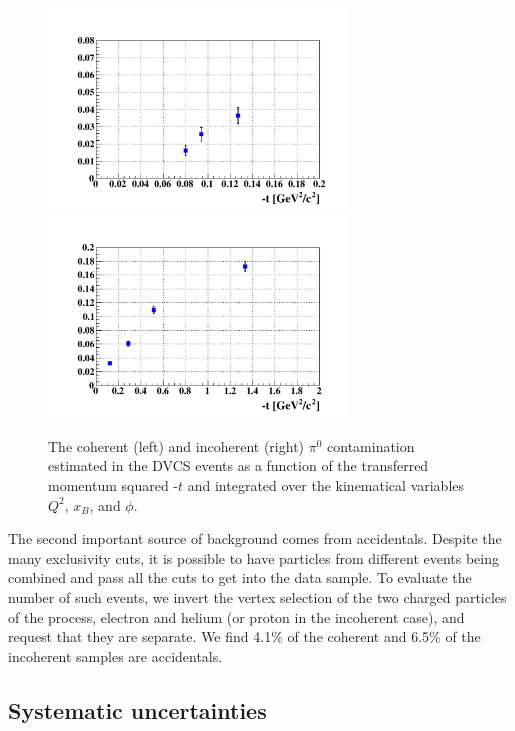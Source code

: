 \documentclass{article}
\begin{document}
\begin{figure}[tbp]
\includegraphics[width=8cm]{fig3/T_ratio_pi0_dvcs_Coh_t.pdf}
\includegraphics[width=8cm]{fig3/T_ratio_pi0_dvcs_InCoh_t.pdf}
\caption{The coherent (left) and incoherent (right) $\pi^{0}$ 
contamination estimated in the DVCS events as a function of the 
transferred momentum squared -$t$ and integrated over the kinematical 
variables $Q^2$, $x_B$, and $\phi$.}
\label{fig:cont_yield}
\end{figure}

The second important source of background comes from accidentals. Despite the many exclusivity cuts, it is 
possible to have particles from different events being combined and pass all the cuts to get 
into the data sample. To evaluate the number of such events, we invert the vertex selection 
of the two charged 
particles of the process, electron and helium (or proton in the incoherent case), and request that they
are separate. We find 4.1\% of the coherent and 6.5\% of the incoherent samples are accidentals. 

\subsection{Systematic uncertainties}
\end{document}
